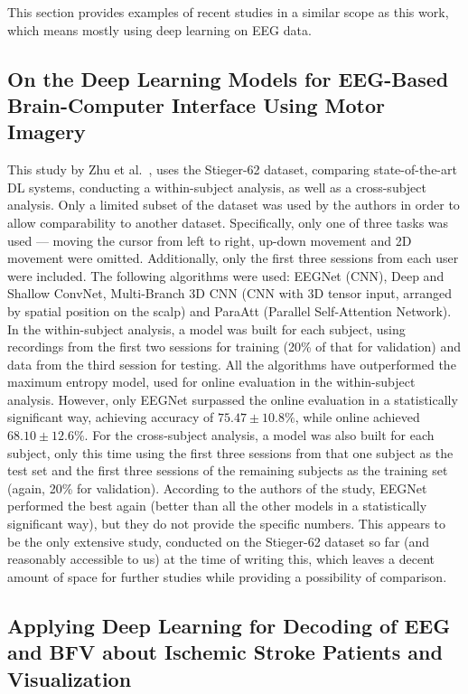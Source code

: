 \documentclass[english, he, bc, kiv, iso690alph]{fasthesis}
\begin{document}
This section provides examples of recent studies in a similar scope as this work, which means mostly using deep learning on EEG data.

\subsection{On the Deep Learning Models for EEG-Based Brain-Computer Interface Using Motor Imagery}

This study by Zhu et al.~\cite{zhu:dl:bci:mi:22}, uses the Stieger-62 dataset, comparing state-of-the-art DL systems, conducting a within-subject analysis, as well as a cross-subject analysis. Only a limited subset of the dataset was used by the authors in order to allow comparability to another dataset. Specifically, only one of three tasks was used --- moving the cursor from left to right, up-down movement and 2D movement were omitted. Additionally, only the first three sessions from each user were included.
The following algorithms were used: EEGNet (CNN), Deep and Shallow ConvNet, Multi-Branch 3D CNN (CNN with 3D tensor input, arranged by spatial position on the scalp) and ParaAtt (Parallel Self-Attention Network). In the within-subject analysis, a model was built for each subject, using recordings from the first two sessions for training (20\% of that for validation) and data from the third session for testing. All the algorithms have outperformed the maximum entropy model, used for online evaluation in the within-subject analysis. However, only EEGNet surpassed the online evaluation in a statistically significant way, achieving accuracy of $75.47 \pm 10.8\%$, while online achieved $68.10 \pm 12.6\%$.\@
For the cross-subject analysis, a model was also built for each subject, only this time using the first three sessions from that one subject as the test set  and the first three sessions of the remaining subjects as the training set (again, 20\% for validation). According to the authors of the study, EEGNet performed the best again (better than all the other models in a statistically significant way), but they do not provide the specific numbers.
This appears to be the only extensive study, conducted on the Stieger-62 dataset so far (and reasonably accessible to us) at the time of writing this, which leaves a decent amount of space for further studies while providing a possibility of comparison.

\subsection{Applying Deep Learning for Decoding of EEG and BFV about Ischemic Stroke Patients and Visualization}
\end{document}
